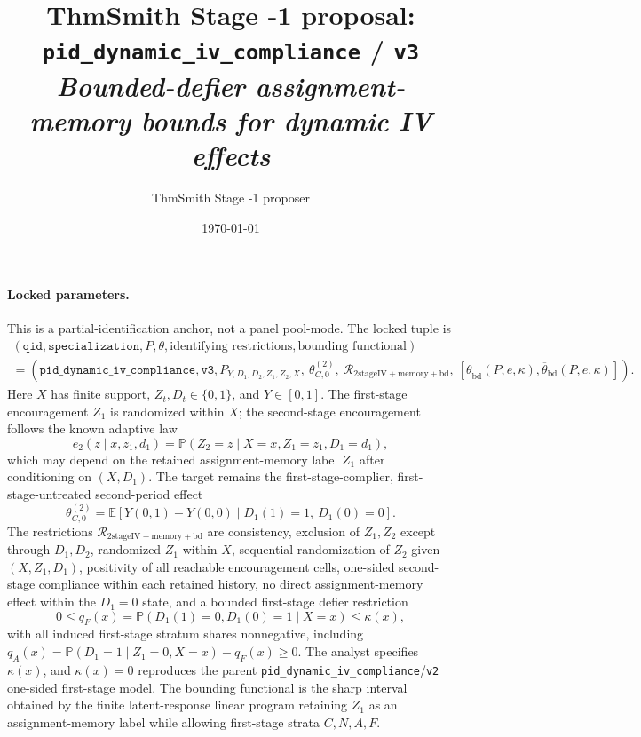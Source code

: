 \documentclass[11pt]{article}
\title{ThmSmith Stage -1 proposal: \texttt{pid\_dynamic\_iv\_compliance} / \texttt{v3}%
  \\ \large\textit{Bounded-defier assignment-memory bounds for dynamic IV effects}}
\author{ThmSmith Stage -1 proposer}
\date{\today}
\newcommand{\E}{\mathbb{E}}
\renewcommand{\Pr}{\mathbb{P}}
\theoremstyle{definition}
\theoremstyle{plain}
\theoremstyle{remark}
\begin{document}
\maketitle


\paragraph{Locked parameters.}
This is a partial-identification anchor, not a panel pool-mode.  The locked tuple is
\[
\begin{gathered}
(\texttt{qid},\texttt{specialization},P,\theta,\text{identifying restrictions},
  \text{bounding functional})\\
=
(\texttt{pid\_dynamic\_iv\_compliance},\texttt{v3},
  P_{Y,D_1,D_2,Z_1,Z_2,X},\ \theta_{C,0}^{(2)},\
  \mathcal{R}_{\mathrm{2stageIV+memory+bd}},\
  [\underline\theta_{\mathrm{bd}}(P,e,\kappa),\overline\theta_{\mathrm{bd}}(P,e,\kappa)]) .
\end{gathered}
\]
Here \(X\) has finite support, \(Z_t,D_t\in\{0,1\}\), and \(Y\in[0,1]\).  The first-stage encouragement \(Z_1\) is randomized within \(X\); the second-stage encouragement follows the known adaptive law
\[
e_2(z\mid x,z_1,d_1)=\Pr(Z_2=z\mid X=x,Z_1=z_1,D_1=d_1),
\]
which may depend on the retained assignment-memory label \(Z_1\) after conditioning on \((X,D_1)\).  The target remains the first-stage-complier, first-stage-untreated second-period effect
\[
\theta_{C,0}^{(2)}
=\E\!\left[Y(0,1)-Y(0,0)\mid D_1(1)=1,\ D_1(0)=0\right].
\]
The restrictions \(\mathcal{R}_{\mathrm{2stageIV+memory+bd}}\) are consistency, exclusion of \(Z_1,Z_2\) except through \(D_1,D_2\), randomized \(Z_1\) within \(X\), sequential randomization of \(Z_2\) given \((X,Z_1,D_1)\), positivity of all reachable encouragement cells, one-sided second-stage compliance within each retained history, no direct assignment-memory effect within the \(D_1=0\) state, and a bounded first-stage defier restriction
\[
0\le q_F(x)=\Pr(D_1(1)=0,D_1(0)=1\mid X=x)\le\kappa(x),
\]
with all induced first-stage stratum shares nonnegative, including \(q_A(x)=\Pr(D_1=1\mid Z_1=0,X=x)-q_F(x)\ge0\).  The analyst specifies \(\kappa(x)\), and \(\kappa(x)=0\) reproduces the parent \texttt{pid\_dynamic\_iv\_compliance}/\texttt{v2} one-sided first-stage model.  The bounding functional is the sharp interval obtained by the finite latent-response linear program retaining \(Z_1\) as an assignment-memory label while allowing first-stage strata \(C,N,A,F\).
\end{document}
